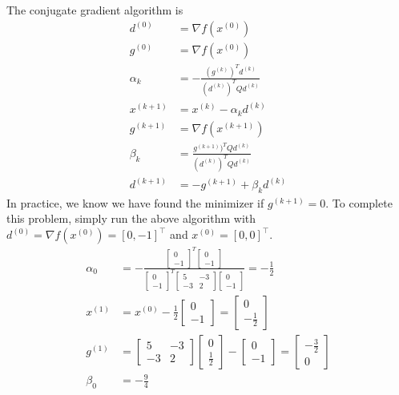 \documentclass{article}
\begin{document}
\begin{enumerate}
 The conjugate gradient algorithm is
 \begin{align*}
  d^{(0)} &= \nabla f(x^{(0)}) \\
  g^{(0)} &= \nabla f(x^{(0)}) \\
  \alpha_k &= -\frac{(g^{(k)})^T d^{(k)}}{(d^{(k)})^T Q d^{(k)}} \\
   x^{(k+1)} &= x^{(k)} - \alpha_k d^{(k)} \\
   g^{(k+1)} &= \nabla f(x^{(k+1)}) \\
   \beta_k &= \frac{g^{(k+1)})^T Q d^{(k)}}{(d^{(k)})^T Q d^{(k)}} \\
   d^{(k+1)} &= - g^{(k+1)} + \beta_k d^{(k)}
 \end{align*}
In practice, we know we have found the minimizer if $g^{(k+1)} = 0$.
To complete this problem, simply run the above algorithm with $d^{(0)} = \nabla f(x^{(0)}) = [0, -1]^\top$ and $x^{(0)} = [0, 0]^\top$.
\begin{align*}
  \alpha_0 &= -\frac{\begin{bmatrix}0 \\ -1\end{bmatrix}^T \begin{bmatrix}0 \\ -1\end{bmatrix}}{\begin{bmatrix}0 \\ -1\end{bmatrix}^T \begin{bmatrix}5 & -3 \\ -3 & 2\end{bmatrix}\begin{bmatrix}0 \\ -1\end{bmatrix}} = -\frac{1}{2}{} \\
  x^{(1)} &= x^{(0)} - \frac{1}{2}\begin{bmatrix}
    0 \\ -1
  \end{bmatrix} = \begin{bmatrix}
    0 \\ -\frac{1}{2}
  \end{bmatrix} \\
  g^{(1)} &= \begin{bmatrix}
    5 & -3 \\ -3 & 2
  \end{bmatrix}\begin{bmatrix}
    0 \\ \frac{1}{2}
  \end{bmatrix} - \begin{bmatrix}
    0 \\ -1
  \end{bmatrix} = \begin{bmatrix}
    -\frac{3}{2} \\ 0
  \end{bmatrix} \\
  \beta_0 &= -\frac{9}{4}
\end{align*}


\end{enumerate}
\end{document}
